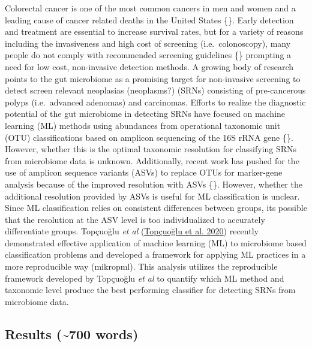 \documentclass[
]{article}
\begin{document}
Colorectal cancer is one of the most common cancers in men and women and
a leading cause of cancer related deaths in the United States \{\}.
Early detection and treatment are essential to increase survival rates,
but for a variety of reasons including the invasiveness and high cost of
screening (i.e.~colonoscopy), many people do not comply with recommended
screening guidelines \{\} prompting a need for low cost, non-invasive
detection methods. A growing body of research points to the gut
microbiome as a promising target for non-invasive screening to detect
screen relevant neoplasias (neoplasms?) (SRNs) consisting of
pre-cancerous polyps (i.e.~advanced adenomas) and carcinomas. Efforts to
realize the diagnostic potential of the gut microbiome in detecting SRNs
have focused on machine learning (ML) methods using abundances from
operational taxonomic unit (OTU) classifications based on amplicon
sequencing of the 16S rRNA gene \{\}. However, whether this is the
optimal taxonomic resolution for classifying SRNs from microbiome data
is unknown. Additionally, recent work has pushed for the use of amplicon
sequence variants (ASVs) to replace OTUs for marker-gene analysis
because of the improved resolution with ASVs \{\}. However, whether the
additional resolution provided by ASVs is useful for ML classification
is unclear. Since ML classification relies on consistent differences
between groups, its possible that the resolution at the ASV level is too
individualized to accurately differentiate groups. Topçuoğlu \emph{et
al} (\protect\hyperlink{ref-topuxe7uolu2020}{Topçuoğlu et al. 2020})
recently demonstrated effective application of machine learning (ML) to
microbiome based classification problems and developed a framework for
applying ML practices in a more reproducible way (mikropml). This
analysis utilizes the reproducible framework developed by Topçuoğlu
\emph{et al} to quantify which ML method and taxonomic level produce the
best performing classifier for detecting SRNs from microbiome data.

\hypertarget{results-700-words}{%
\subsection{Results (\textasciitilde700
words)}\label{results-700-words}}
\end{document}
